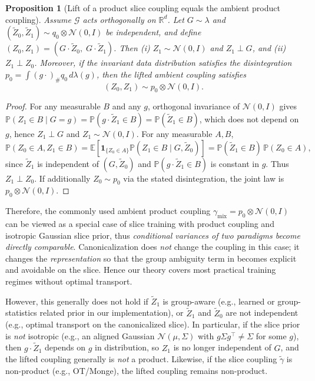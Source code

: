 \documentclass{article}
\theoremstyle{plain}
\newtheorem{proposition}[theorem]{Proposition}
\theoremstyle{definition}
\theoremstyle{remark}
\newcommand{\1}{\mathbf{1}}
\begin{document}
\begin{proposition}[Lift of a product slice coupling equals the ambient product coupling]
\label{prop:lift-product}
Assume $\mathcal G$ acts orthogonally on $\mathbb R^d$.
Let $G\sim \lambda$ and $(\widetilde Z_0,\widetilde Z_1)\sim q_0\otimes \mathcal N(0,I)$ be independent, and define
$(Z_0,Z_1)=(G\cdot \widetilde Z_0,\;G\cdot \widetilde Z_1)$.
Then (i) $Z_1\sim \mathcal N(0,I)$ and $Z_1\perp G$, and (ii) $Z_1\perp Z_0$.
Moreover, if the invariant data distribution satisfies the disintegration
$p_0 = \int (g\cdot)_{\#} q_0\, d\lambda(g)$, then the lifted ambient coupling satisfies
\begin{equation}
(Z_0,Z_1)\sim p_0\otimes \mathcal N(0,I).
\end{equation}
\end{proposition}

\begin{proof}
For any measurable $B$ and any $g$, orthogonal invariance of $\mathcal N(0,I)$ gives
$\mathbb P(Z_1\in B\mid G=g)=\mathbb P(g\cdot \widetilde Z_1\in B)=\mathbb P(\widetilde Z_1\in B)$,
which does not depend on $g$, hence $Z_1\perp G$ and $Z_1\sim \mathcal N(0,I)$.
For any measurable $A,B$,
\begin{equation}
\mathbb P(Z_0\in A, Z_1\in B)
=\mathbb E\!\left[\mathbf 1_{\{Z_0\in A\}}\mathbb P(Z_1\in B\mid G,\widetilde Z_0)\right]
=\mathbb P(\widetilde Z_1\in B)\,\mathbb P(Z_0\in A),
\end{equation}
since $\widetilde Z_1$ is independent of $(G,\widetilde Z_0)$ and $\mathbb P(g\cdot \widetilde Z_1\in B)$ is constant in $g$.
Thus $Z_1\perp Z_0$. If additionally $Z_0\sim p_0$ via the stated disintegration, the joint law is
$p_0\otimes\mathcal N(0,I)$.
\end{proof}
Therefore, the commonly used ambient product coupling $\gamma_{\mathrm{mix}}=p_0\otimes\mathcal N(0,I)$ can be viewed as a special case of slice training with product coupling and isotropic Gaussian slice prior, thus \emph{conditional variances of two paradigms become directly comparable}.
Canonicalization does \emph{not} change the coupling in this case; it changes the \emph{representation} so that the group ambiguity term in  becomes explicit and avoidable on the slice. Hence our theory covers most practical training regimes without optimal transport.

However, this generally does not hold if $\tilde Z_1$ is group-aware (e.g., learned or group-statistics related prior in our implementation), or $\tilde Z_1$ and $\tilde Z_0$ are not independent (e.g., optimal transport on the canonicalized slice). In particular, if the slice prior is \emph{not} isotropic (e.g., an aligned Gaussian $\mathcal N(\mu,\Sigma)$ with $g\Sigma g^\top\neq \Sigma$ for some $g$), then $g\cdot \widetilde Z_1$ depends on $g$ in distribution, so $Z_1$ is no longer independent of $G$, and the lifted coupling generally is \emph{not} a product.
Likewise, if the slice coupling $\widetilde\gamma$ is non-product (e.g., OT/Monge), the lifted coupling remains non-product.
\end{document}
